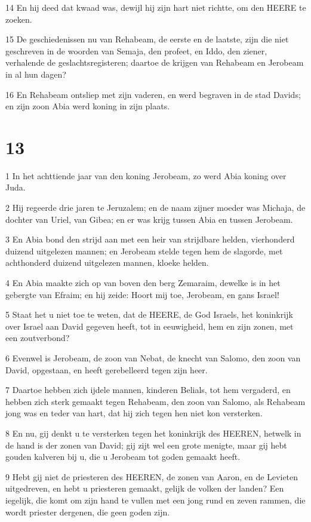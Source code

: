 \par 14 En hij deed dat kwaad was, dewijl hij zijn hart niet richtte, om den HEERE te zoeken.
\par 15 De geschiedenissen nu van Rehabeam, de eerste en de laatste, zijn die niet geschreven in de woorden van Semaja, den profeet, en Iddo, den ziener, verhalende de geslachtsregisteren; daartoe de krijgen van Rehabeam en Jerobeam in al hun dagen?
\par 16 En Rehabeam ontsliep met zijn vaderen, en werd begraven in de stad Davids; en zijn zoon Abia werd koning in zijn plaats.

\chapter{13}

\par 1 In het achttiende jaar van den koning Jerobeam, zo werd Abia koning over Juda.
\par 2 Hij regeerde drie jaren te Jeruzalem; en de naam zijner moeder was Michaja, de dochter van Uriel, van Gibea; en er was krijg tussen Abia en tussen Jerobeam.
\par 3 En Abia bond den strijd aan met een heir van strijdbare helden, vierhonderd duizend uitgelezen mannen; en Jerobeam stelde tegen hem de slagorde, met achthonderd duizend uitgelezen mannen, kloeke helden.
\par 4 En Abia maakte zich op van boven den berg Zemaraim, dewelke is in het gebergte van Efraim; en hij zeide: Hoort mij toe, Jerobeam, en gans Israel!
\par 5 Staat het u niet toe te weten, dat de HEERE, de God Israels, het koninkrijk over Israel aan David gegeven heeft, tot in eeuwigheid, hem en zijn zonen, met een zoutverbond?
\par 6 Evenwel is Jerobeam, de zoon van Nebat, de knecht van Salomo, den zoon van David, opgestaan, en heeft gerebelleerd tegen zijn heer.
\par 7 Daartoe hebben zich ijdele mannen, kinderen Belials, tot hem vergaderd, en hebben zich sterk gemaakt tegen Rehabeam, den zoon van Salomo, als Rehabeam jong was en teder van hart, dat hij zich tegen hen niet kon versterken.
\par 8 En nu, gij denkt u te versterken tegen het koninkrijk des HEEREN, hetwelk in de hand is der zonen van David; gij zijt wel een grote menigte, maar gij hebt gouden kalveren bij u, die u Jerobeam tot goden gemaakt heeft.
\par 9 Hebt gij niet de priesteren des HEEREN, de zonen van Aaron, en de Levieten uitgedreven, en hebt u priesteren gemaakt, gelijk de volken der landen? Een iegelijk, die komt om zijn hand te vullen met een jong rund en zeven rammen, die wordt priester dergenen, die geen goden zijn.
